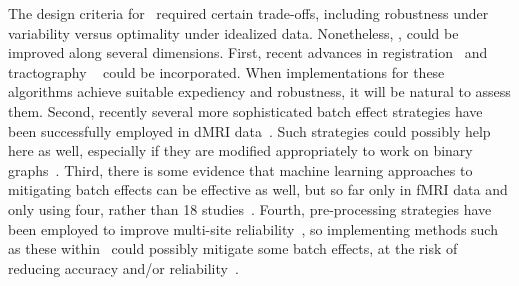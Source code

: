 \documentclass[11pt]{article}
\begin{document}
\begin{multicols}{2}
%
The design criteria for \ndmg~required certain trade-offs, including robustness under variability versus optimality under idealized data.  
Nonetheless, \ndmg, could be improved along several dimensions.
First, 
recent advances in registration~\cite{lddmm} and tractography ~\cite{probtrackx} could be incorporated.
When implementations for these algorithms achieve suitable expediency and robustness, it will be natural to assess them. 
Second, recently several more sophisticated batch effect strategies have been successfully employed in dMRI data~\cite{Fortin2017-dm}. Such strategies could possibly help here as well, especially if they are modified appropriately to work on binary graphs~\cite{Leek2007}.
%
Third, there is some evidence that machine learning approaches to mitigating batch effects can be effective as well, but so far only in fMRI data and only using four, rather than 18 studies~\cite{abraham2017deriving}.
Fourth, pre-processing strategies have been employed to improve multi-site reliability~\cite{mirzaalian2017harmonization}, so implementing methods such as these within \ndmg~could possibly mitigate some batch effects, at the risk of reducing accuracy and/or reliability~\cite{adhd}.



\end{multicols}
\end{document}
